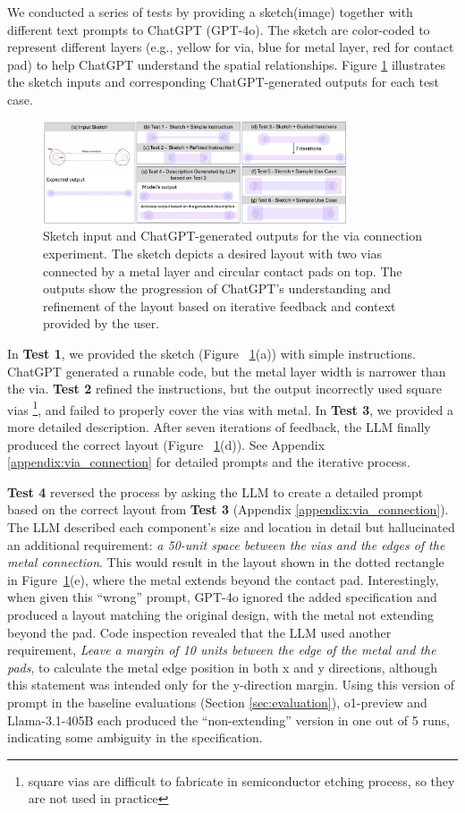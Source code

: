 \documentclass{article}
\begin{document}
We conducted a series of tests by providing a sketch(image) together with different text prompts to ChatGPT (GPT-4o). The sketch are color-coded to represent different layers (e.g., yellow for via, blue for metal layer, red for contact pad) to help ChatGPT understand the spatial relationships. Figure \ref{fig:via_experiment} illustrates the sketch inputs and corresponding ChatGPT-generated outputs for each test case.
\begin{figure}[ht]
\centering
\includegraphics[width=0.8\textwidth]{Figure1_v5.png}
\caption{Sketch input and ChatGPT-generated outputs for the via connection experiment. The sketch depicts a desired layout with two vias connected by a metal layer and circular contact pads on top. The outputs show the progression of ChatGPT's understanding and refinement of the layout based on iterative feedback and context provided by the user.}
\label{fig:via_experiment}
\end{figure}
In \textbf{Test 1}, we provided the sketch (Figure ~\ref{fig:via_experiment}(a)) with simple instructions. ChatGPT generated a runable code, but the metal layer width is narrower than the via. \textbf{Test 2} refined the instructions, but the output incorrectly used square vias \footnote{square vias are difficult to fabricate in semiconductor etching process, so they are not used in practice}, and failed to properly cover the vias with metal. In \textbf{Test 3}, we provided a more detailed description. After seven iterations of feedback, the LLM finally produced the correct layout (Figure ~\ref{fig:via_experiment}(d)). See Appendix \ref{appendix:via_connection} for detailed prompts and the iterative process.

\textbf{Test 4} reversed the process by asking the LLM to create a detailed prompt based on the correct layout from \textbf{Test 3} (Appendix \ref{appendix:via_connection}). The LLM described each component's size and location in detail but hallucinated an additional requirement: \textit{a 50-unit space between the vias and the edges of the metal connection}. This would result in the layout shown in the dotted rectangle in Figure~\ref{fig:via_experiment}(e), where the metal extends beyond the contact pad. Interestingly, when given this ``wrong'' prompt, GPT-4o ignored the added specification and produced a layout matching the original design, with the metal not extending beyond the pad. Code inspection revealed that the LLM used another requirement, \textit{Leave a margin of 10 units between the edge of the metal and the pads}, to calculate the metal edge position in both x and y directions, although this statement was intended only for the y-direction margin. Using this version of prompt in the baseline evaluations (Section \ref{sec:evaluation}), o1-preview and Llama-3.1-405B each produced the ``non-extending'' version in one out of 5 runs, indicating some ambiguity in the specification.
\end{document}
